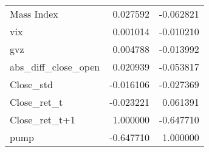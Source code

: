 \begin{tabular}{lrr}
Mass Index               &       0.027592 & -0.062821 \\
vix                      &       0.001014 & -0.010210 \\
gvz                      &       0.004788 & -0.013992 \\
abs\_diff\_close\_open      &       0.020939 & -0.053817 \\
Close\_std                &      -0.016106 & -0.027369 \\
Close\_ret\_t              &      -0.023221 &  0.061391 \\
Close\_ret\_t+1            &       1.000000 & -0.647710 \\
pump                     &      -0.647710 &  1.000000 \\
\bottomrule
\end{tabular}
